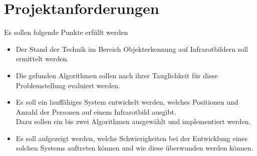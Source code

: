 \section{Projektanforderungen}
\label{sec:Requirements}

Es sollen folgende Punkte erfüllt werden

\begin{itemize}
	\item Der Stand der Technik im Bereich Objekterkennung auf Infrarotbildern soll ermittelt werden.
	\item Die gefunden Algorithmen sollen nach ihrer Tauglichkeit für diese Problemstellung evaluiert werden.
	\item Es soll ein lauffähiges System entwickelt werden, welches Positionen und Anzahl der Personen auf einem Infrarotbild ausgibt.\\
	Dazu sollen ein bis zwei Algorithmen ausgewählt und implementiert werden.
	\item Es soll aufgezeigt werden, welche Schwierigkeiten bei der Entwicklung eines solchen Systems auftreten können und wie diese überwunden werden können.

\end{itemize}



